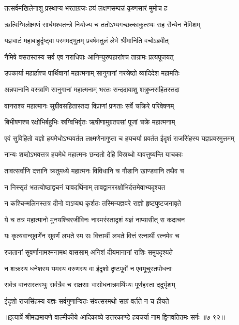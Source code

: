 
\twolineshloka
{तत्सर्वमखिलेनाशु प्रस्थाप्य भरताग्रजः}
{हयं लक्षणसम्पन्नं कृष्णसारं मुमोच ह} %

\twolineshloka
{ऋत्विग्भिर्लक्ष्मणं सार्धमश्वतन्त्रे नियोज्य च}
{ततोऽभ्यगच्छत्काकुत्स्थः सह सैन्येन नैमिशम्} %

\twolineshloka
{यज्ञवाटं महाबाहुर्दृष्ट्वा परममद्भुतम्}
{प्रबर्षमतुलं लेभे श्रीमानिति वचोऽब्रवीत्} %

\twolineshloka
{नैमिषे वसतस्तस्य सर्व एव नराधिपाः}
{आनिन्युरुपहारांश्च तान्रामः प्रत्यपूजयत्} %

\twolineshloka
{उपकार्या महार्हाश्च पार्थिवानां महात्मनाम्}
{सानुगानां नरश्रेष्ठो व्यादिदेश महामतिः} %

\twolineshloka
{अन्नपानानि वस्त्राणि सानुगानां महात्मनाम्}
{भरतः सन्ददावाशु शत्रुघ्नसहितस्तदा} %

\twolineshloka
{वानराश्च महात्मानः सुग्रीवसहितास्तदा}
{विप्राणां प्रणताः सर्वे चक्रिरे परिवेषणम्} %

\twolineshloka
{बिभीषणश्च रक्षोभिर्बहुभिः स्रग्विभिर्वृतः}
{ऋषीणामुग्रतपसां पूजां चक्रे महात्मनाम्} %

\threelineshloka
{एवं सुविहितो यज्ञो हयमेधोऽभ्यवर्तत}
{लक्ष्मणेनागुप्ता च हयचर्या प्रवर्तत}
{ईदृशं राजसिंहस्य यज्ञप्रवरमुत्तमम्} %

\twolineshloka
{नान्यः शब्दोऽभवत्तत्र हयमेधे महात्मनः}
{छन्दतो देहि विस्रब्धो यावत्तुष्यन्ति याचकाः} %

\twolineshloka
{तावत्सर्वाणि दत्तानि क्रतुमध्ये महात्मनः}
{विविधानि च गौडानि खाण्डवानि तथैव च} %

\twolineshloka
{न निस्सृतं भतत्योष्ठाद्वचनं यावदर्थिनाम्}
{तावद्वानररक्षोभिर्दत्तमेवाभ्यदृश्यत} %

\twolineshloka
{न कश्चिन्मलिनस्तत्र दीनो वाऽप्यथ कृर्शतः}
{तस्मिन्यज्ञवरे राज्ञो हृष्टपुष्टजनावृते} %

\twolineshloka
{ये च तत्र महात्मानो मुनयश्चिरजीविनः}
{नास्मरंस्तादृशं यज्ञं नाप्यासीत् स कदाचन} %

\twolineshloka
{यः कृत्यवान्सुवर्णेन सुवर्णं लभते स्म सः}
{वित्तार्थी लभते वित्तं रत्नार्थी रत्नमेव च} %

\twolineshloka
{रजतानां सुवर्णानामश्मनामथ वाससाम्}
{अनिशं दीयमानानां राशिः समुपदृश्यते} %

\twolineshloka
{न शक्रस्य धनेशस्य यमस्य वरुणस्य वा}
{ईदृशो दृष्टपूर्वो न एवमूचुस्तपोधनाः} %

\twolineshloka
{सर्वत्र वानरास्तस्थुः सर्वत्रैव च राक्षसाः}
{वासोधनान्नमर्थिभ्यः पूर्णहस्ता ददुर्भृशम्} %

\twolineshloka
{ईदृशो राजसिंहस्य यज्ञः सर्वगुणान्वितः}
{संवत्सरमथो साग्रं वर्तते न च हीयते} %


॥इत्यार्षे श्रीमद्रामायणे वाल्मीकीये आदिकाव्ये उत्तरकाण्डे हयचर्या नाम द्विनवतितमः सर्गः ॥७-९२॥

